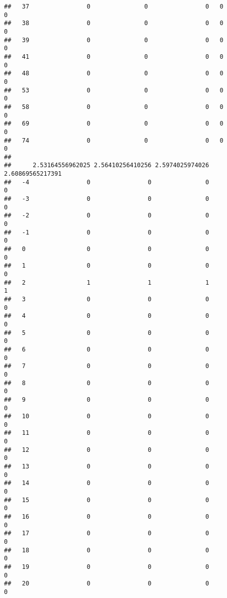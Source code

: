 \documentclass[]{article}
\begin{document}
\begin{verbatim}
##   37                0               0                0   0                0
##   38                0               0                0   0                0
##   39                0               0                0   0                0
##   41                0               0                0   0                0
##   48                0               0                0   0                0
##   53                0               0                0   0                0
##   58                0               0                0   0                0
##   69                0               0                0   0                0
##   74                0               0                0   0                0
##     
##      2.53164556962025 2.56410256410256 2.5974025974026 2.60869565217391
##   -4                0                0               0                0
##   -3                0                0               0                0
##   -2                0                0               0                0
##   -1                0                0               0                0
##   0                 0                0               0                0
##   1                 0                0               0                0
##   2                 1                1               1                1
##   3                 0                0               0                0
##   4                 0                0               0                0
##   5                 0                0               0                0
##   6                 0                0               0                0
##   7                 0                0               0                0
##   8                 0                0               0                0
##   9                 0                0               0                0
##   10                0                0               0                0
##   11                0                0               0                0
##   12                0                0               0                0
##   13                0                0               0                0
##   14                0                0               0                0
##   15                0                0               0                0
##   16                0                0               0                0
##   17                0                0               0                0
##   18                0                0               0                0
##   19                0                0               0                0
##   20                0                0               0                0

\end{verbatim}
\end{document}
